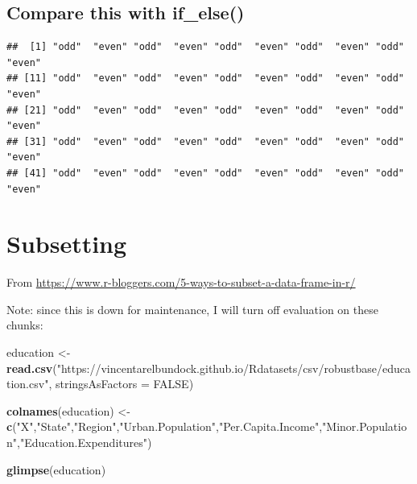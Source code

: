 \documentclass[]{book}
\newenvironment{Shaded}{\begin{snugshade}}{\end{snugshade}}
\newcommand{\DataTypeTok}[1]{\textcolor[rgb]{0.13,0.29,0.53}{#1}}
\newcommand{\DecValTok}[1]{\textcolor[rgb]{0.00,0.00,0.81}{#1}}
\newcommand{\KeywordTok}[1]{\textcolor[rgb]{0.13,0.29,0.53}{\textbf{#1}}}
\newcommand{\NormalTok}[1]{#1}
\newcommand{\OperatorTok}[1]{\textcolor[rgb]{0.81,0.36,0.00}{\textbf{#1}}}
\newcommand{\OtherTok}[1]{\textcolor[rgb]{0.56,0.35,0.01}{#1}}
\newcommand{\StringTok}[1]{\textcolor[rgb]{0.31,0.60,0.02}{#1}}
\begin{document}
\hypertarget{compare-this-with-if_else}{%
\section{Compare this with if\_else()}\label{compare-this-with-if_else}}

\begin{Shaded}
\end{Shaded}

\begin{verbatim}
##  [1] "odd"  "even" "odd"  "even" "odd"  "even" "odd"  "even" "odd"  "even"
## [11] "odd"  "even" "odd"  "even" "odd"  "even" "odd"  "even" "odd"  "even"
## [21] "odd"  "even" "odd"  "even" "odd"  "even" "odd"  "even" "odd"  "even"
## [31] "odd"  "even" "odd"  "even" "odd"  "even" "odd"  "even" "odd"  "even"
## [41] "odd"  "even" "odd"  "even" "odd"  "even" "odd"  "even" "odd"  "even"
\end{verbatim}

\hypertarget{subset}{%
\chapter{Subsetting}\label{subset}}

From \url{https://www.r-bloggers.com/5-ways-to-subset-a-data-frame-in-r/}

Note: since this is down for maintenance, I will turn off evaluation on these chunks:

\begin{Shaded}
\begin{Highlighting}[]
\NormalTok{education <-}\StringTok{ }\KeywordTok{read.csv}\NormalTok{(}\StringTok{"https://vincentarelbundock.github.io/Rdatasets/csv/robustbase/education.csv"}\NormalTok{, }\DataTypeTok{stringsAsFactors =} \OtherTok{FALSE}\NormalTok{)}

\KeywordTok{colnames}\NormalTok{(education) <-}\StringTok{ }\KeywordTok{c}\NormalTok{(}\StringTok{"X"}\NormalTok{,}\StringTok{"State"}\NormalTok{,}\StringTok{"Region"}\NormalTok{,}\StringTok{"Urban.Population"}\NormalTok{,}\StringTok{"Per.Capita.Income"}\NormalTok{,}\StringTok{"Minor.Population"}\NormalTok{,}\StringTok{"Education.Expenditures"}\NormalTok{)}

\KeywordTok{glimpse}\NormalTok{(education)}
\end{Highlighting}
\end{Shaded}
\end{document}
